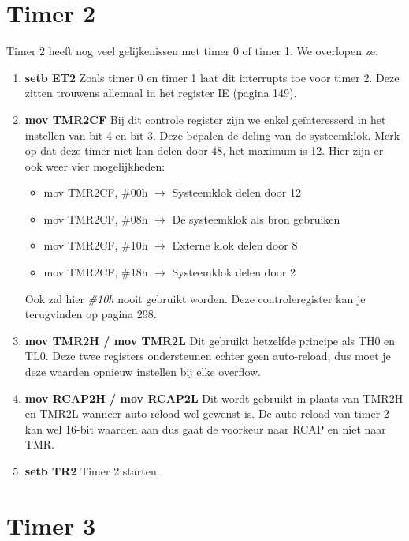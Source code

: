 \documentclass{report}
\begin{document}
\section{Timer 2}
Timer 2 heeft nog veel gelijkenissen met timer 0 of timer 1. We overlopen ze.
\begin{enumerate}
	\item \textbf{setb ET2}
	\newline
	Zoals timer 0 en timer 1 laat dit interrupts toe voor timer 2. Deze zitten trouwens allemaal in het register IE (pagina 149).
	\item \textbf{mov TMR2CF}
	\newline
	Bij dit controle register zijn we enkel geïnteresserd in het instellen van bit 4 en bit 3. Deze bepalen  de deling van de systeemklok. Merk op dat deze timer niet kan delen door 48, het maximum is 12. Hier zijn er ook weer vier mogelijkheden:
	\begin{itemize}
		\item mov TMR2CF, \#00h $\rightarrow$ Systeemklok delen door 12
		\item mov TMR2CF, \#08h $\rightarrow$ De systeemklok als bron gebruiken
		\item mov TMR2CF, \#10h $\rightarrow$ Externe klok delen door 8
		\item mov TMR2CF, \#18h $\rightarrow$ Systeemklok delen door 2
	\end{itemize}
	Ook zal hier \textit{\#10h} nooit gebruikt worden. Deze controleregister kan je terugvinden op pagina 298.
	\item \textbf{mov TMR2H / mov TMR2L}
	\newline
	Dit gebruikt hetzelfde principe als TH0 en TL0. Deze twee registers ondersteunen echter geen auto-reload, dus moet je deze waarden opnieuw instellen bij elke overflow.
	\item \textbf{mov RCAP2H / mov RCAP2L}
	\newline
	Dit wordt gebruikt in plaats van TMR2H en TMR2L wanneer auto-reload wel gewenst is. De auto-reload van timer 2 kan wel 16-bit waarden aan dus gaat de voorkeur naar RCAP en niet naar TMR.
	\item \textbf{setb TR2}
	Timer 2 starten.
	
\end{enumerate}

\section{Timer 3}
\end{document}
